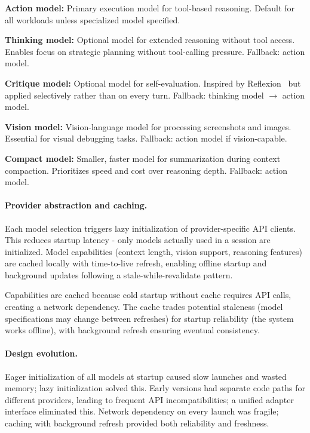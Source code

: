 \begin{packeditemize}
\item \textbf{Action model:} Primary execution model for tool-based reasoning. Default for all workloads unless specialized model specified.

\item \textbf{Thinking model:} Optional model for extended reasoning without tool access. Enables focus on strategic planning without tool-calling pressure. Fallback: action model.

\item \textbf{Critique model:} Optional model for self-evaluation. Inspired by Reflexion~\cite{shinn2023reflexion} but applied selectively rather than on every turn. Fallback: thinking model $\to$ action model.

\item \textbf{Vision model:} Vision-language model for processing screenshots and images. Essential for visual debugging tasks. Fallback: action model if vision-capable.

\item \textbf{Compact model:} Smaller, faster model for summarization during context compaction. Prioritizes speed and cost over reasoning depth. Fallback: action model.
\end{packeditemize}

\paragraph{Provider abstraction and caching.} Each model selection triggers lazy initialization of provider-specific API clients. This reduces startup latency - only models actually used in a session are initialized. Model capabilities (context length, vision support, reasoning features) are cached locally with time-to-live refresh, enabling offline startup and background updates following a stale-while-revalidate pattern.

Capabilities are cached because cold startup without cache requires API calls, creating a network dependency. The cache trades potential staleness (model specifications may change between refreshes) for startup reliability (the system works offline), with background refresh ensuring eventual consistency.

\paragraph{Design evolution.} Eager initialization of all models at startup caused slow launches and wasted memory; lazy initialization solved this. Early versions had separate code paths for different providers, leading to frequent API incompatibilities; a unified adapter interface eliminated this. Network dependency on every launch was fragile; caching with background refresh provided both reliability and freshness.

